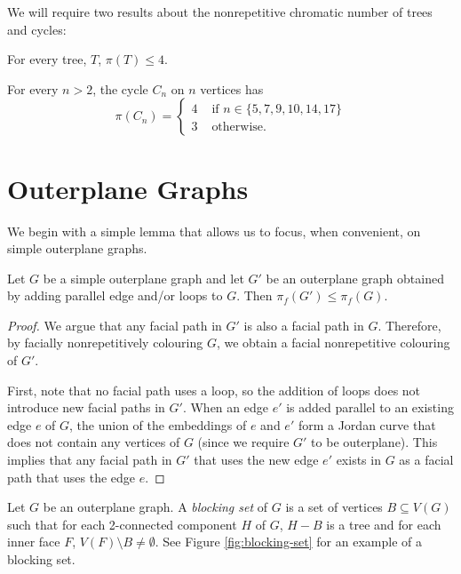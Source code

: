 \documentclass{patmorin}
\begin{document}
We will require two results about the nonrepetitive chromatic number of
trees and cycles:

\begin{thm}
  For every tree, $T$, $\pi(T) \leq 4$.
\end{thm}

\begin{thm}
  For every $n>2$, the cycle $C_n$ on $n$ vertices has
  \[
  \pi(C_n) = \begin{cases}
              4 & \text{ if } n \in \{5,7,9,10,14,17\} \\
              3 & \text{ otherwise. }
             \end{cases}
  \]
\end{thm}

\section{Outerplane Graphs}

We begin with a simple lemma that allows us to focus, when convenient,
on simple outerplane graphs.

\begin{lem}
  Let $G$ be a simple outerplane graph and let $G'$ be an outerplane graph obtained by adding parallel edge and/or loops to $G$.  Then $\pi_f(G')\le\pi_f(G)$.
\end{lem}

\begin{proof}
   We argue that any facial path in $G'$ is also a facial path in $G$.
   Therefore, by facially nonrepetitively colouring $G$, we obtain a facial
   nonrepetitive colouring of $G'$.

   First, note that no facial path uses a loop, so the addition of
   loops does not introduce new facial paths in $G'$.  When an edge
   $e'$ is added parallel to an existing edge $e$ of $G$, the union
   of the embeddings of $e$ and $e'$ form a Jordan curve that does not
   contain any vertices of $G$ (since we require $G'$ to be outerplane).
   This implies that any facial path in $G'$ that uses the new edge $e'$
   exists in $G$ as a facial path that uses the edge $e$.
\end{proof}

Let $G$ be an outerplane graph. A \emph{blocking set} of $G$ is a set
of vertices $B \subseteq V(G)$ such that for each 2-connected component
$H$ of $G$, $H-B$ is a tree and for each inner face $F$,
$V(F) \setminus B \ne \emptyset$.  See Figure \ref{fig:blocking-set}
for an example of a blocking set.
\end{document}

